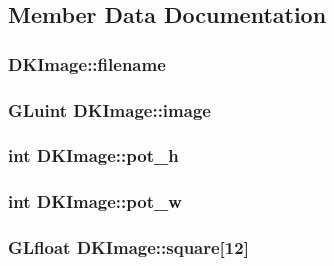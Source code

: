 \subsection{Member Data Documentation}
\hypertarget{class_d_k_image_a12b6108f0fee5230984fd2275c24a8ae}{
\subsubsection[{filename}]{ D\-K\-Image\-::filename}}\label{class_d_k_image_a12b6108f0fee5230984fd2275c24a8ae}
\hypertarget{class_d_k_image_ac6a91aafc8bd16854d644186b2c3497b}{
\subsubsection[{image}]{\setlength{\rightskip}{0pt plus 5cm}G\-Luint D\-K\-Image\-::image}}\label{class_d_k_image_ac6a91aafc8bd16854d644186b2c3497b}
\hypertarget{class_d_k_image_ae9cdd848d1f31c486d4433b3739363a2}{
\subsubsection[{pot\-\_\-h}]{\setlength{\rightskip}{0pt plus 5cm}int D\-K\-Image\-::pot\-\_\-h}}\label{class_d_k_image_ae9cdd848d1f31c486d4433b3739363a2}
\hypertarget{class_d_k_image_a3df23f7ab223f3d7e6e2654395ef6fe1}{
\subsubsection[{pot\-\_\-w}]{\setlength{\rightskip}{0pt plus 5cm}int D\-K\-Image\-::pot\-\_\-w}}\label{class_d_k_image_a3df23f7ab223f3d7e6e2654395ef6fe1}
\hypertarget{class_d_k_image_a7b0cb338893f6327718b19c92ffef3d4}{
\subsubsection[{square}]{\setlength{\rightskip}{0pt plus 5cm}G\-Lfloat D\-K\-Image\-::square\mbox{[}12\mbox{]}}}\label{class_d_k_image_a7b0cb338893f6327718b19c92ffef3d4}
